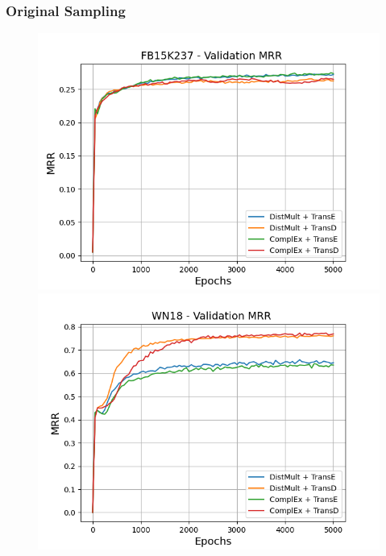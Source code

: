 \subsubsection{Original Sampling}


\begin{figure}
    \centering
    \begin{minipage}{.3\textwidth}
      \centering
      \includegraphics[width=\linewidth]{figures/results/gan_train/not_pretrained/random/fb15k237/epochs5000/random_fb15k237_mrrs.png}
    \end{minipage}%
    \begin{minipage}{.3\textwidth}
      \centering
      \includegraphics[width=\linewidth]{figures/results/gan_train/not_pretrained/random/wn18/epochs5000/random_wn18_mrrs.png}

\end{minipage}
\end{figure}
